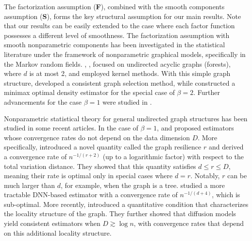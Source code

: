 \documentclass[twoside,11pt]{article}
\newcommand{\bB}{{\bf B}}
\newcommand{\bF}{{\bf F}}
\newcommand{\bS}{{\bf S}}
\newcommand{\bx}{{\bf x}}
\newcommand{\bbR}{{\mathbb R}}
\begin{document}

The factorization assumption (\bF), combined with the smooth components assumption (\bS), forms the key structural assumption for our main results. Note that our results can be easily extended to the case where each factor function possesses a different level of smoothness.
The factorization assumption with smooth nonparametric components has been investigated in the statistical literature under the framework of nonparametric graphical models, specifically in the Markov random fields.
\citet{liu2011forest}, \citet{liu2012exponential}, \citet{gyorfi2023tree} focused on undirected acyclic graphs (forests), where $d$ is at most 2, and employed kernel methods. With this simple graph structure, \citet{liu2011forest} developed a consistent graph selection method, while \citet{liu2012exponential} constructed a minimax optimal density estimator for the special case of $\beta = 2$. Further advancements for the case $\beta = 1$ were studied in \citet{gyorfi2023tree}.

Nonparametric statistical theory for general undirected graph structures has been studied in some recent articles. In the case of $\beta = 1$, \citet{vandermeulen2024breaking} and \citet{vandermeulen2024dimension} proposed estimators whose convergence rates do not depend on the data dimension $D$. More specifically, \citet{vandermeulen2024breaking} introduced a novel quantity called the graph resilience $r$ and derived a convergence rate of $n^{-1/(r+2)}$ (up to a logarithmic factor) with respect to the total variation distance. They showed that this quantity satisfies $d \leq r \leq D$, meaning their rate is optimal only in special cases where $d = r$. Notably, $r$ can be much larger than $d$, for example, when the graph is a tree. \citet{vandermeulen2024dimension} studied a more tractable DNN-based estimator with a convergence rate of $n^{-1/(d+4)}$, which is sub-optimal.
More recently, \citet{gottwald2025localized} introduced a quantitative condition that characterizes the locality structure of the graph. They further showed that diffusion models yield consistent estimators when $D \gtrsim \log n$, with convergence rates that depend on this additional locality structure.
\end{document}
